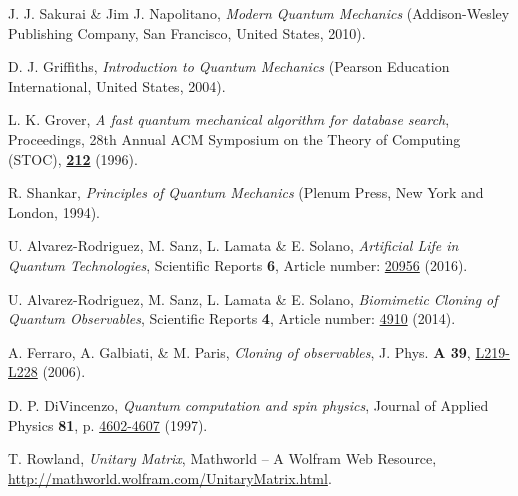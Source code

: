 \documentclass[11pt]{article}
\numberwithin{equation}{section} %
\numberwithin{figure}{section} %
\begin{document}
\begin{thebibliography}{X}
 J. J. Sakurai \& Jim J. Napolitano, {\it Modern Quantum Mechanics} (Addison-Wesley Publishing Company, San Francisco, United States, 2010).

 D. J. Griffiths, {\it Introduction to Quantum Mechanics} (Pearson Education International, United States, 2004).

 L. K. Grover, {\it  A fast quantum mechanical algorithm for database search}, Proceedings, 28th Annual ACM Symposium on the Theory of Computing (STOC), \href{https://arxiv.org/pdf/quant-ph/9605043v3.pdf}{\bf 212} (1996).

 R. Shankar, {\it Principles of Quantum Mechanics} (Plenum Press, New York and London, 1994).

 U. Alvarez-Rodriguez, M. Sanz, L. Lamata \& E. Solano, {\it Artificial Life in Quantum Technologies}, Scientific Reports {\bf 6}, Article number: \href{https://www.nature.com/articles/srep20956.pdf}{20956} (2016). 

 U. Alvarez-Rodriguez, M. Sanz, L. Lamata \& E. Solano, {\it Biomimetic Cloning of Quantum Observables}, Scientific Reports {\bf 4}, Article number: \href{https://www.nature.com/articles/srep04910.pdf}{4910} (2014).

 A. Ferraro, A. Galbiati, \& M. Paris, {\it Cloning of observables}, J. Phys. {\bf A 39}, \href{https://arxiv.org/pdf/quant-ph/0509170.pdf}{L219-L228} (2006).

 D. P. DiVincenzo, {\it Quantum computation and spin physics}, Journal of Applied Physics {\bf 81}, p. \href{https://aip.scitation.org/doi/pdf/10.1063/1.365176?class=pdf}{4602-4607} (1997).

 T. Rowland, {\it Unitary Matrix}, Mathworld -- A Wolfram Web Resource,  \href{http://mathworld.wolfram.com/UnitaryMatrix.html}{http://mathworld.wolfram.com/UnitaryMatrix.html}.





\end{thebibliography}
\end{document}
